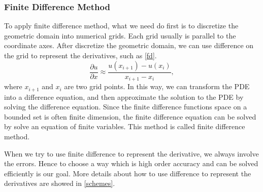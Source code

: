 \documentclass[english, nochinese]{pkupaper}
\begin{document}
\subsubsection{Finite Difference Method}
\par To apply finite difference method, what we need do first is to discretize the geometric domain into numerical grids. Each grid usually is parallel to the coordinate axes. After discretize the geometric domain, we can use difference on the grid to represent the derivatives, such as \eqref{fd}.
\begin{equation}\label{fd}
	\frac{\partial u}{\partial x}\approx\frac{u(x_{i+1}) - u(x_i)}{x_{i+1} - x_i},
\end{equation}
where $x_{i+1}$ and $x_i$ are two grid points. In this way, we can transform the PDE into a difference equation, and then approximate the solution to the PDE by solving the difference equation. Since the finite difference functions space on a bounded set is often finite dimension, the finite difference equation can be solved by solve an equation of finite variables. This method is called finite difference method.
\par When we try to use finite difference to represent the derivative, we always involve the errors. Hence to choose a way which is high order accuracy and can be solved efficiently is our goal. More details about how to use difference to represent the derivatives are showed in \ref{schemes}.
\end{document}
